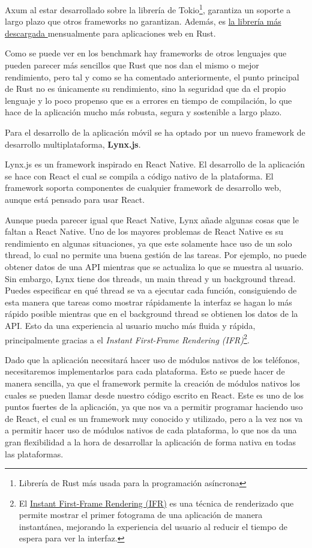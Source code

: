 Axum al estar desarrollado sobre la librería de Tokio\footnote{Librería de Rust más usada para la programación asíncrona}, garantiza un soporte a largo plazo que otros frameworks no garantizan. Además, es \href{https://lib.rs/crates/axum}{la librería más descargada }mensualmente para aplicaciones web en Rust.  

Como se puede ver en los benchmark hay frameworks de otros lenguajes que pueden parecer más sencillos que Rust que nos dan el mismo o mejor rendimiento, pero tal y como se ha comentado anteriormente, el punto principal de Rust no es únicamente su rendimiento, sino la seguridad que da el propio lenguaje y lo poco propenso que es a errores en tiempo de compilación, lo que hace de la aplicación mucho más robusta, segura y sostenible a largo plazo.


Para el desarrollo de la aplicación móvil se ha optado por un nuevo framework de desarrollo multiplataforma, \textbf{Lynx.js}.

Lynx.js es un framework inspirado en React Native. El desarrollo de la aplicación se hace con React el cual se compila a código nativo de la plataforma. El framework soporta componentes de cualquier framework de desarrollo web, aunque está pensado para usar React.

Aunque pueda parecer igual que React Native, Lynx añade algunas cosas que le faltan a React Native. Uno de los mayores problemas de React Native es su rendimiento en algunas situaciones, ya que este solamente hace uso de un solo thread, lo cual no permite una buena gestión de las tareas. Por ejemplo, no puede obtener datos de una API mientras que se actualiza lo que se muestra al usuario.
Sin embargo, Lynx tiene dos threads, un main thread y un background thread.
Puedes especificar en qué thread se va a ejecutar cada función, consiguiendo de esta manera que tareas como mostrar rápidamente la interfaz se hagan lo más rápido posible mientras que en el background thread se obtienen los datos de la API.
Esto da una experiencia al usuario mucho más fluida y rápida, principalmente gracias a el \textit{Instant First-Frame Rendering (IFR)}\footnote{El \href{https://lynxjs.org/guide/interaction/ifr.html}{Instant First-Frame Rendering (IFR)} es una técnica de renderizado que permite mostrar el primer fotograma de una aplicación de manera instantánea, mejorando la experiencia del usuario al reducir el tiempo de espera para ver la interfaz.}.

Dado que la aplicación necesitará hacer uso de módulos nativos de los teléfonos, necesitaremos implementarlos para cada plataforma.
Esto se puede hacer de manera sencilla, ya que el framework permite la creación de módulos nativos los cuales se pueden llamar desde nuestro código escrito en React.
Este es uno de los puntos fuertes de la aplicación, ya que nos va a permitir programar haciendo uso de React, el cual es un framework muy conocido y utilizado, pero a la vez nos va a permitir hacer uso de módulos nativos de cada plataforma, lo que nos da una gran flexibilidad a la hora de desarrollar la aplicación de forma nativa en todas las plataformas.

